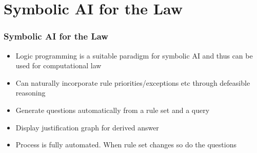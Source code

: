 \documentclass{beamer}
\begin{document}
\section{Symbolic AI for the Law}


\begin{frame}[fragile]\frametitle{Symbolic AI for the Law}

\begin{itemize}
\item Logic programming is a suitable paradigm for symbolic AI and thus can be used for computational law
\item Can naturally incorporate rule priorities/exceptions etc through defeasible reasoning
\end{itemize}

\vspace{4mm}
\begin{itemize}
\item Generate questions automatically from a rule set and a query
\item Display justification graph for derived answer
\item Process is fully automated. When rule set changes so do the questions
\end{itemize}

\end{frame}



\end{document}
